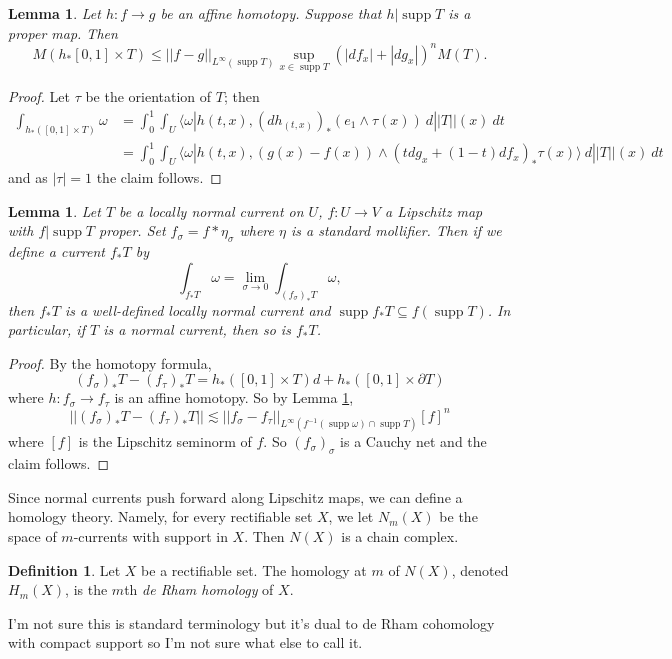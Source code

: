 \documentclass[reqno,12pt,letterpaper]{amsart}
\DeclareMathOperator{\supp}{supp}
\newcommand{\dfn}[1]{\emph{#1}\index{#1}}
\newtheorem{lemma}[theorem]{Lemma}
\theoremstyle{definition}
\newtheorem{definition}[theorem]{Definition}
\numberwithin{equation}{section}
\begin{document}
\begin{lemma}
\label{affine homotopy mass}
Let $h: f \to g$ be an affine homotopy. Suppose that $h|\supp T$ is a proper map. Then
$$M(h_*[0, 1] \times T) \leq ||f - g||_{L^\infty(\supp T)} \sup_{x \in \supp T} (|df_x| + |dg_x|)^n M(T).$$
\end{lemma}
\begin{proof}
Let $\tau$ be the orientation of $T$; then
\begin{align*}
\int_{h_*([0, 1] \times T)} \omega &= \int_0^1 \int_U \langle \omega|h(t, x), (dh_{(t, x)})_*(e_1 \wedge \tau(x)) ~d||T||(x) ~dt\\
&= \int_0^1 \int_U \langle \omega|h(t, x), (g(x) - f(x)) \wedge (tdg_x + (1 - t)df_x)_* \tau(x)\rangle ~d||T||(x) ~dt
\end{align*}
and as $|\tau| = 1$ the claim follows.
\end{proof}

\begin{lemma}
Let $T$ be a locally normal current on $U$, $f: U \to V$ a Lipschitz map with $f|\supp T$ proper.
Set $f_\sigma = f * \eta_\sigma$ where $\eta$ is a standard mollifier. Then if we define a current $f_*T$ by
$$\int_{f_* T} \omega = \lim_{\sigma \to 0} \int_{(f_\sigma)_* T} \omega,$$
then $f_*T$ is a well-defined locally normal current and $\supp f_*T \subseteq f(\supp T)$.
In particular, if $T$ is a normal current, then so is $f_*T$.
\end{lemma}
\begin{proof}
By the homotopy formula,
$$(f_\sigma)_*T - (f_\tau)_* T = h_*([0, 1] \times T)d + h_*([0, 1] \times \partial T)$$
where $h: f_\sigma \to f_\tau$ is an affine homotopy. So by Lemma \ref{affine homotopy mass},
$$||(f_\sigma)_*T - (f_\tau)_*T|| \lesssim ||f_\sigma - f_\tau||_{L^\infty(f^{-1}(\supp \omega) \cap \supp T)} [f]^n$$
where $[f]$ is the Lipschitz seminorm of $f$.
So $(f_\sigma)_\sigma$ is a Cauchy net and the claim follows.
\end{proof}

Since normal currents push forward along Lipschitz maps, we can define a homology theory.
Namely, for every rectifiable set $X$, we let $N_m(X)$ be the space of $m$-currents with support in $X$.
Then $N(X)$ is a chain complex.

\begin{definition}
Let $X$ be a rectifiable set. The homology at $m$ of $N(X)$, denoted $H_m(X)$, is the $m$th \dfn{de Rham homology} of $X$.
\end{definition}
I'm not sure this is standard terminology but it's dual to de Rham cohomology with compact support so I'm not sure what else to call it.
\end{document}
